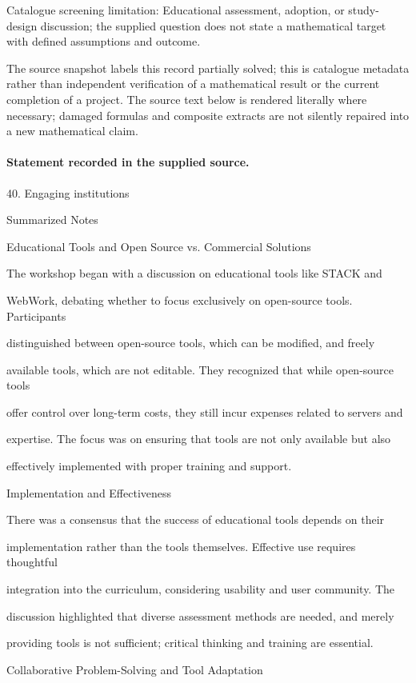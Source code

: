 \documentclass[11pt]{article}
\begin{document}
Catalogue screening limitation: Educational assessment, adoption, or study-design discussion; the supplied question does not state a mathematical target with defined assumptions and outcome.

The source snapshot labels this record partially solved; this is catalogue metadata rather than independent verification of a mathematical result or the current completion of a project.
The source text below is rendered literally where necessary; damaged formulas and composite extracts are not silently repaired into a new mathematical claim.
\paragraph{Statement recorded in the supplied source.}
40. Engaging institutions

Summarized Notes

Educational Tools and Open Source vs. Commercial Solutions

The workshop began with a discussion on educational tools like STACK and

WebWork, debating whether to focus exclusively on open-source tools. Participants

distinguished between open-source tools, which can be modified, and freely

available tools, which are not editable. They recognized that while open-source tools

offer control over long-term costs, they still incur expenses related to servers and

expertise. The focus was on ensuring that tools are not only available but also

effectively implemented with proper training and support.

Implementation and Effectiveness

There was a consensus that the success of educational tools depends on their

implementation rather than the tools themselves. Effective use requires thoughtful

integration into the curriculum, considering usability and user community. The

discussion highlighted that diverse assessment methods are needed, and merely

providing tools is not sufficient; critical thinking and training are essential.

Collaborative Problem-Solving and Tool Adaptation
\end{document}
